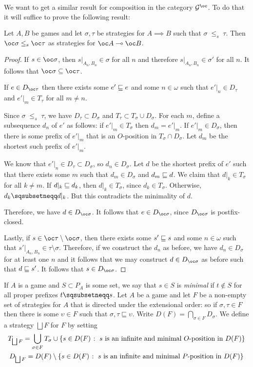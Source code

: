 \documentclass{article}
\newcommand{\stle}{{\;\le_s\;}}
\newcommand{\exle}{\sqsubseteq}
\newcommand{\exlub}{\bigsqcup}
\begin{document}
We want to get a similar result for composition in the category $\G^{\oc}$.  To do that it will suffice to prove the following result:

\begin{proposition}
  Let $A,B$ be games and let $\sigma,\tau$ be strategies for $A\implies B$ such that $\sigma\stle\tau$.  Then $\oc\sigma\stle\oc\tau$ as strategies for $\oc A\implies \oc B$.
  \begin{proof}
    If $s\in\oc\sigma$, then $s\vert_{A_n,B_n}\in\sigma$ for all $n$ and therefore $s\vert_{A_n,B_n}\in\sigma'$ for all $n$.  It follows that $\oc\sigma\subset\oc\tau$.

    If $e\in D_{\oc\tau}$ then there exists some $e'\sqsubseteq e$ and some $n\in\omega$ such that $e'\vert_n\in D_\tau$ and $e'\vert_m\in T_\tau$ for all $m\ne n$.  

    Since $\sigma\stle\tau$, we have $D_\tau\subset D_\sigma$ and $T_\tau\subset T_\sigma\cup D_\sigma$.  For each $m$, define a subsequence $d_n$ of $e'$ as follows: if $e'\vert_m\in T_\sigma$ then $d_m=e'\vert_m$.  If $e'\vert_m\in D_\sigma$, then there is some prefix of $e'\vert_m$ that is an $O$-position in $T_\sigma\cap D_\sigma$.  Let $d_m$ be the shortest such prefix of $e'\vert_m$.   

    We know that $e'\vert_n\in D_\tau\subset D_\sigma$, so $d_n\in D_\sigma$.  Let $d$ be the shortest prefix of $e'$ such that there exists some $m$ such that $d_m\in D_\sigma$ and $d_m\sqsubseteq d$.  We claim that $d\vert_k\in T_\sigma$ for all $k\neq m$.  If $d\vert_k\sqsubseteq d_k$, then $d\vert_k\in T_\sigma$, since $d_k\in T_\sigma$.  Otherwise, $d_k\pprefix d\vert_k$.  But this contradicts the minimality of $d$.  

    Therefore, we have $d\in D_{\oc\sigma}$.  It follows that $e\in D_{\oc\sigma}$, since $D_{\oc\sigma}$ is postfix-closed.

    Lastly, if $s\in \oc\tau\setminus\oc\sigma$, then there exists some $s'\sqsubseteq s$ and some $n\in\omega$ such that $s'\vert_{A_n,B_n}\in\tau\setminus\sigma$.  Therefore, if we construct the $d_n$ as before, we have $d_n\in D_\sigma$ for at least one $n$ and it follows that we may construct $d\in D_{\oc\sigma}$ as before such that $d\sqsubseteq s'$.  It follows that $s\in D_{\oc\sigma}$.  
  \end{proof}
\end{proposition}

If $A$ is a game and $S\subset P_A$ is some set, we say that $s\in S$ is \emph{minimal} if $t\not\in S$ for all proper prefixes $t\pprefix s$.  Let $A$ be a game and let $F$ be a non-empty set of strategies for $A$ that is directed under the extensional order: so if $\sigma,\tau\in F$ then there is some $\upsilon\in F$ such that $\sigma,\tau\exle\upsilon$.  Write $D(F) = \bigcap_{\sigma\in F}D_\sigma$.  We define a strategy $\exlub F$ for $F$ by setting
\begin{gather*}
  T_{\exlub F} = \bigcup_{\sigma\in F}T_\sigma \cup \{s\in D(F)\suchthat\textrm{$s$ is an infinite and minimal $O$-position in $D(F)$}\} \\
  D_{\exlub F} = D(F) \setminus \{s\in D(F)\suchthat\textrm{$s$ is an infinite and minimal $P$-position in $D(F)$}\}
\end{gather*}
\end{document}
